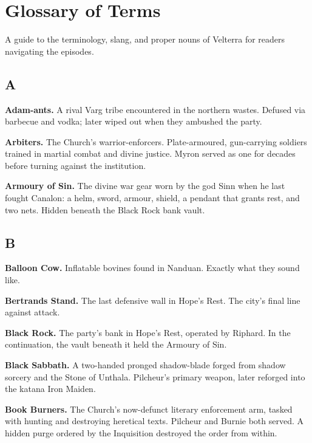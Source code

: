 \section{Glossary of Terms}

\noindent
A guide to the terminology, slang, and proper nouns of Velterra for readers navigating the episodes.

\vspace{3mm}

\subsection*{A}

\noindent
\textbf{Adam-ants.} A rival Varg tribe encountered in the northern wastes. Defused via barbecue and vodka; later wiped out when they ambushed the party.

\smallskip \noindent
\textbf{Arbiters.} The Church's warrior-enforcers. Plate-armoured, gun-carrying soldiers trained in martial combat and divine justice. Myron served as one for decades before turning against the institution.

\smallskip \noindent
\textbf{Armoury of Sin.} The divine war gear worn by the god Sinn when he last fought Canalon: a helm, sword, armour, shield, a pendant that grants rest, and two nets. Hidden beneath the Black Rock bank vault.

\subsection*{B}

\noindent
\textbf{Balloon Cow.} Inflatable bovines found in Nanduan. Exactly what they sound like.

\smallskip \noindent
\textbf{Bertrands Stand.} The last defensive wall in Hope's Rest. The city's final line against attack.

\smallskip \noindent
\textbf{Black Rock.} The party's bank in Hope's Rest, operated by Riphard. In the continuation, the vault beneath it held the Armoury of Sin.

\smallskip \noindent
\textbf{Black Sabbath.} A two-handed pronged shadow-blade forged from shadow sorcery and the Stone of Unthala. Pilcheur's primary weapon, later reforged into the katana Iron Maiden.

\smallskip \noindent
\textbf{Book Burners.} The Church's now-defunct literary enforcement arm, tasked with hunting and destroying heretical texts. Pilcheur and Burnie both served. A hidden purge ordered by the Inquisition destroyed the order from within.

